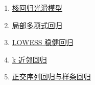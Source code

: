 \documentclass[11pt]{article}
\renewcommand{\today}{\shortmonthname[\the\month] \the \day,  \the\year}
\begin{document}
\begin{multicols}{2}
\begin{enumerate}
		\item \href{https://mp.weixin.qq.com/s/-7ZS5hrbXbzVnbN_dY42qg}{核回归光滑模型}	%
		\item \href{https://mp.weixin.qq.com/s/neXwXL5nbB0GhadkrZ5N0g}{局部多项式回归}	%
		\item \href{https://mp.weixin.qq.com/s/OtZ4cEzbMB5NyOzuRUECZQ}{LOWESS 稳健回归}	%
		\item \href{https://mp.weixin.qq.com/s/D7Ha1OxQbxj_ej0ptU0wcQ}{k 近邻回归}	%
		\item \href{https://mp.weixin.qq.com/s/YnYYk2RLB1kRYM2wRhjNRQ}{正交序列回归与样条回归}	%
	\end{enumerate}
\end{multicols}




%

\end{document}
